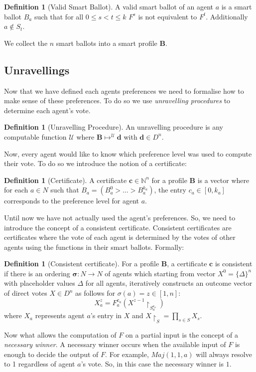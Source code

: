 \documentclass[11pt,a4paper, titlepage]{article}
\theoremstyle{definition}
\newtheorem{definition}[theorem]{Definition}
\let\vec\mathbf
\begin{document}
\begin{definition}[Valid Smart Ballot]
    A valid smart ballot of an agent $a$ is a smart ballot $B_a$ such that for all $ 0 \leq s < t \leq k$ $F^s$ is not equivalent to $F^t$. Additionally $a \notin S_t$.
\end{definition}


We collect the $n$ smart ballots into a smart profile $\mathbf{B}$.

\subsection{Unravellings}

Now that we have defined each agents preferences we need to formalise how to make sense of these preferences. To do so we use \emph{unravelling procedures} to determine each agent's vote.

\begin{definition}[Unravelling Procedure]
    An unravelling procedure is any computable function $\mathcal{U}$ where $\mathbf{B} \mapsto^\mathcal{U} \vec{d}$ with $\vec{d} \in D^n$.


\end{definition}

Now, every agent would like to know which preference level was used to compute their vote. To do so we introduce the notion of a certificate:

\begin{definition}[Certificate]
    A certificate $\mathbf{c} \in \mathbb{N}^n$ for a profile $\mathbf{B}$ is a vector where for each $a \in N$ such that $B_a = (B_a^0 > \ldots > B_a^{k_a})$, the entry $c_a \in [0, k_a]$ corresponds to the preference level for agent $a$.  
\end{definition}

Until now we have not actually used the agent's preferences. So, we need to introduce the concept of a consistent certificate. Consistent certificates are certificates where the vote of each agent is determined by the votes of other agents using the functions in their smart ballots. Formally:

\begin{definition}[Consistent certificate]
    For a profile $\mathbf{B}$, a certificate $\mathbf{c}$ is consistent if there is an ordering $\mathbf{\sigma} \colon N \longrightarrow N$ of agents which starting from vector $X^0 = \{\Delta\}^n$ with placeholder values $\Delta$ for all agents, iteratively constructs an outcome vector of direct votes $X \in D^n$ as follows for $\sigma(a) = z \in [1,n]$:
    \[
        X^z_a = F^{\mathbf{c}_a}_a(X^{z-1} \restriction_{S^{\mathbf{c}_a}_a} )
    \]
    where $X_a$ represents agent $a$'s entry in $X$ and $X \restriction_S = \prod_{s \in S} X_s$.

\end{definition}
Now what allows the computation of $F$ on a partial input is the concept of a \emph{necessary winner}. A necessary winner occurs when the available input of $F$ is enough to decide  the output of $F$. For example, $\mathit{Maj}(1, 1, a)$ will always resolve to 1 regardless of agent $a$'s vote. So, in this case the necessary winner is $1$.
\end{document}
